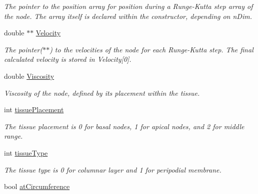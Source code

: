 \begin{DoxyCompactItemize}
\begin{DoxyCompactList}\small\item\em The pointer to the position array for position during a Runge-\/\+Kutta step array of the node. The array itself is declared within the constructor, depending on n\+Dim. \end{DoxyCompactList}\item 
\hypertarget{classNode_ac27dee69b570030aacf8865190879845}{}double $\ast$$\ast$ \hyperlink{classNode_ac27dee69b570030aacf8865190879845}{Velocity}\label{classNode_ac27dee69b570030aacf8865190879845}

\begin{DoxyCompactList}\small\item\em The pointer($\ast$$\ast$) to the velocities of the node for each Runge-\/\+Kutta step. The final calculated velocity is stored in Velocity\mbox{[}0\mbox{]}. \end{DoxyCompactList}\item 
\hypertarget{classNode_a69fe9806911156a4b9db8d2aca1b6328}{}double \hyperlink{classNode_a69fe9806911156a4b9db8d2aca1b6328}{Viscosity}\label{classNode_a69fe9806911156a4b9db8d2aca1b6328}

\begin{DoxyCompactList}\small\item\em Viscosity of the node, defined by its placement within the tissue. \end{DoxyCompactList}\item 
\hypertarget{classNode_af754322e3928dc45f70b19762551890a}{}int \hyperlink{classNode_af754322e3928dc45f70b19762551890a}{tissue\+Placement}\label{classNode_af754322e3928dc45f70b19762551890a}

\begin{DoxyCompactList}\small\item\em The tissue placement is 0 for basal nodes, 1 for apical nodes, and 2 for middle range. \end{DoxyCompactList}\item 
\hypertarget{classNode_ae621097f98f1d33d283cf65a0a02d29a}{}int \hyperlink{classNode_ae621097f98f1d33d283cf65a0a02d29a}{tissue\+Type}\label{classNode_ae621097f98f1d33d283cf65a0a02d29a}

\begin{DoxyCompactList}\small\item\em The tissue type is 0 for columnar layer and 1 for peripodial membrane. \end{DoxyCompactList}\item 
\hypertarget{classNode_ab6b225354ad961f2e9bd5d7fe9b67b3a}{}bool \hyperlink{classNode_ab6b225354ad961f2e9bd5d7fe9b67b3a}{at\+Circumference}\label{classNode_ab6b225354ad961f2e9bd5d7fe9b67b3a}


\end{DoxyCompactItemize}
